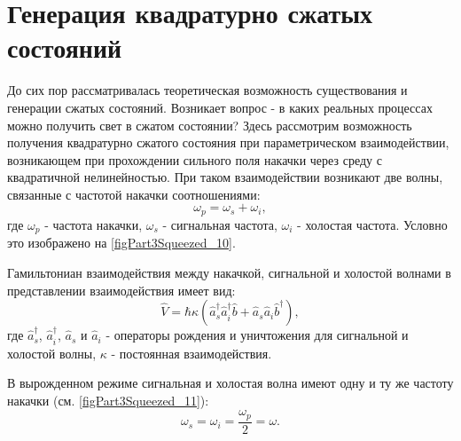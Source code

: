 \section{Генерация квадратурно сжатых состояний}
\label{pNonClassGenerSqueezed}
До сих пор рассматривалась теоретическая возможность существования и
генерации сжатых состояний. Возникает вопрос - в каких реальных
процессах можно получить свет в сжатом состоянии? Здесь рассмотрим
возможность получения квадратурно сжатого состояния при
параметрическом взаимодействии, возникающем при прохождении сильного
поля накачки через среду с квадратичной нелинейностью. При таком
взаимодействии возникают две волны, связанные с частотой накачки
соотношениями:
\begin{equation}
\omega_p = \omega_s + \omega_i,
\nonumber
\end{equation}
где $\omega_p$ - частота накачки, $\omega_s$ - сигнальная частота,
$\omega_i$ - холостая частота. Условно это изображено на 
\autoref{figPart3Squeezed_10}.




Гамильтониан взаимодействия между накачкой, сигнальной и холостой
волнами в представлении взаимодействия имеет вид:
\begin{equation}
\hat{V} = \hbar \kappa \left(
\hat{a}^{\dag}_s \hat{a}^{\dag}_i \hat{b} + 
\hat{a}_s \hat{a}_i \hat{b}^{\dag}
\right),
\label{eqPart3Squeezed30}
\end{equation}
где $\hat{a}^{\dag}_s$, $\hat{a}^{\dag}_i$, 
$\hat{a}_s$ и $\hat{a}_i$ - операторы рождения и уничтожения для
сигнальной и холостой волны, $\kappa$ - постоянная взаимодействия.



В вырожденном режиме сигнальная и холостая волна имеют одну и ту же
частоту накачки (см. \autoref{figPart3Squeezed_11}):
\[
\omega_s = \omega_i = \frac{\omega_p}{2} = \omega.
\]

